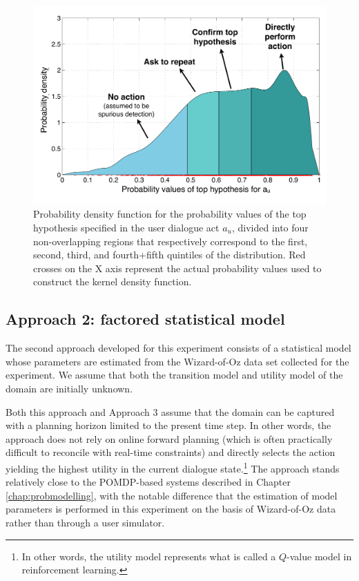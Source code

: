 \begin{figure}[h!]
\centering
\includegraphics[scale=0.4]{imgs/asrconfidence.pdf} 
\caption{Probability density function for the probability values of the top hypothesis specified in the user dialogue act $a_u$, divided into four non-overlapping regions that respectively correspond to the first, second, third, and fourth+fifth quintiles of the distribution. Red crosses on the X axis represent the actual probability values used to construct the kernel density function. }
\label{fig:asrconfidence-exp3}
\end{figure}


\subsection{Approach 2: factored statistical model}
\label{sec:approach2}

The second approach developed for this experiment consists of a statistical model whose parameters are estimated from the Wizard-of-Oz data set collected for the experiment. We assume that both the transition model and utility model of the domain are initially unknown. 

Both this approach and Approach 3 assume that the domain can be captured with a planning horizon limited to the present time step.  In other words, the approach does not rely on online forward planning (which is often practically difficult to reconcile with real-time constraints) and directly selects the action yielding the highest utility in the current dialogue state.\footnote{In other words, the utility model represents what is called a $Q$-value model in reinforcement learning.} The approach stands relatively close to the POMDP-based systems described in Chapter \ref{chap:probmodelling}, with the notable difference that the estimation of model parameters is performed in this experiment on the basis of Wizard-of-Oz data rather than through a user simulator. 

